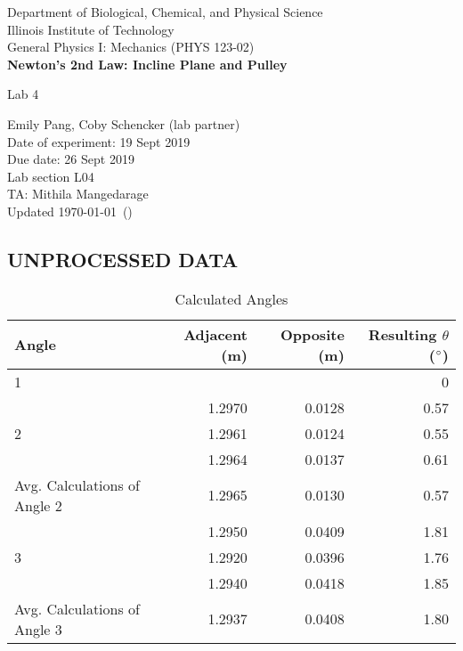 \documentclass [12pt, letterpaper, twoside] {article}
\begin{document}
\begin {titlepage}
\begin {center}
Department of Biological, Chemical, and Physical Science\\
\vspace {0.1cm}
Illinois Institute of Technology\\
\vspace {0.1cm}
General Physics I: Mechanics (PHYS 123-02)\\
\vspace* {\fill}
\begingroup
\Large
\textbf {Newton's 2nd Law: Incline Plane and Pulley}
\vspace {0.35cm}

\normalsize
Lab 4
\vspace {1.5cm}
\endgroup
\vspace* {\fill}
\end {center}

\vspace*{\fill}
\begin {flushright}
\footnotesize
Emily Pang, Coby Schencker (lab partner)\\
Date of experiment: 19 Sept 2019\\
Due date: 26 Sept 2019\\
Lab section L04\\
TA: Mithila Mangedarage\\
Updated \usdate\today~(\currenttime)
\end {flushright}
\end {titlepage}

\subsection* {UNPROCESSED DATA}
  \begin {table}[h]
   \centering
    \begin {tabular} {| l | r | r | r |}
      \hline\hline
      Angle & Adjacent (m) & Opposite (m) & Resulting \(\theta\) (\(\degree\)) \\
      \hline
      1 & & & 0 \\
      \hline
      \multirow {3}{*}{2} & 1.2970 & 0.0128 & 0.57 \\ %
      & 1.2961 & 0.0124 & 0.55 \\ %
      & 1.2964 & 0.0137 & 0.61 \\ %
      \hline
      Avg. Calculations of Angle 2 & 1.2965 & 0.0130 & 0.57 \\ %
      \hline
      \multirow {3}{*}{3} & 1.2950 & 0.0409 & 1.81 \\ %
      & 1.2920 & 0.0396 & 1.76 \\ %
      & 1.2940 & 0.0418 & 1.85 \\ %
      \hline
      Avg. Calculations of Angle 3 & 1.2937 & 0.0408 & 1.80 \\ %
      \hline\hline
    \end {tabular}
    \caption {Calculated Angles}
  \end {table}
\end{document}
